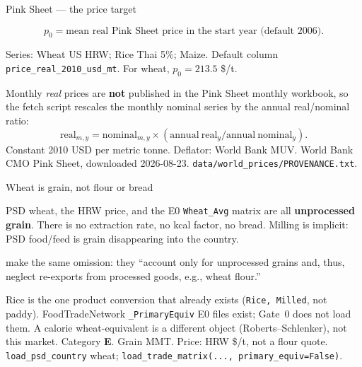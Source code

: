 \begin{frame}{Pink Sheet --- the price target}

\[
p_0 = \text{mean real Pink Sheet price in the start year (default 2006)}.
\]

Series: Wheat US HRW; Rice Thai 5\%; Maize. Default column
\texttt{price\_real\_2010\_usd\_mt}. For wheat, $p_0=213.5$ \$/t.

Monthly \emph{real} prices are \textbf{not} published in the Pink Sheet
monthly workbook, so the fetch script rescales the monthly nominal series
by the annual real/nominal ratio:
\[
\mathrm{real}_{m,y} = \mathrm{nominal}_{m,y}\times
(\mathrm{annual\ real}_y / \mathrm{annual\ nominal}_y).
\]
{Constant 2010 USD per metric tonne. Deflator: World Bank MUV.}
{World Bank CMO Pink Sheet, downloaded 2026-08-23.
\texttt{data/world\_prices/PROVENANCE.txt}.}
\end{frame}

\begin{frame}{Wheat is grain, not flour or bread}

PSD wheat, the HRW price, and the E0 \texttt{Wheat\_Avg} matrix are all
\textbf{unprocessed grain}. There is no extraction rate, no kcal factor,
no bread. Milling is implicit: PSD food/feed is grain disappearing into
the country.

\citet{kuhla2025} make the same omission: they ``account only for
unprocessed grains and, thus, neglect re-exports from processed goods,
e.g., wheat flour.''

Rice is the one product conversion that already exists
(\texttt{Rice, Milled}, not paddy). FoodTradeNetwork
\texttt{\_PrimaryEquiv} E0 files exist; Gate~0 does not load them.
A calorie wheat-equivalent is a different object (Roberts--Schlenker),
not this market. Category \textbf{E}.
{Grain MMT. Price: HRW \$/t, not a flour quote.}
{\texttt{load\_psd\_country} wheat; \texttt{load\_trade\_matrix(..., primary\_equiv=False)}.}
\end{frame}

